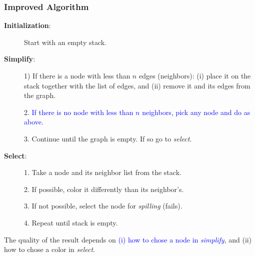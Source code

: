 \documentclass{beamer}
\newcommand{\blue}[1]{\textcolor{Blue}{{#1}}}
\renewcommand{\emph}[1]{\textcolor{structure}{#1}}
\begin{document}
\begin{frame}
\frametitle{Improved Algorithm}

\begin{description}

\item[{\bf Initialization}:] Start with an empty stack.\bigskip

\item[{\bf Simplify}:] 1) If there is a node with less than $n$ edges (neighbors):
        (i) place it on the stack together with the list of edges,
        and (ii) remove it and its edges from the graph.\smallskip


  2. \blue{If there is no node with less than $n$ neighbors, pick
        any node and do as above.}\smallskip


  3. Continue until the graph is empty. If so go to {\em select}.\bigskip


\item[{\bf Select}:] 1. Take a node and its neighbor list from the stack.\smallskip

    2. \emph{If possible, color it differently than its neighbor's.}\smallskip

    3. If not possible, select the node for {\em spilling} (fails).\smallskip

    4. Repeat until stack is empty.

\end{description}

\bigskip

The quality of the result depends on \blue{(i) how to chose a node in
{\em simplify}}, and \emph{(ii) how to chose a color in {\em select}}.

\end{frame}
\end{document}
